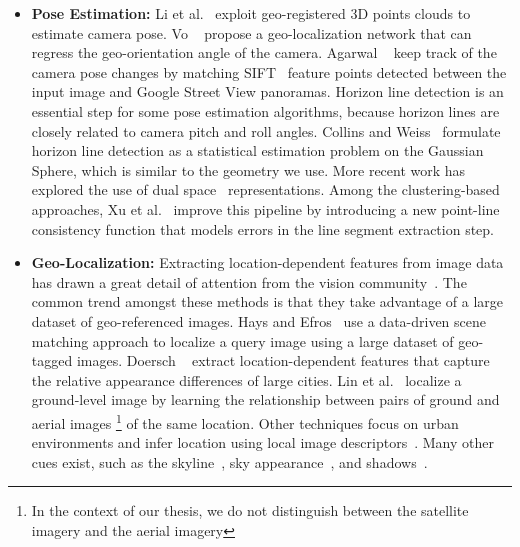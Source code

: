 \begin{itemize}[noitemsep]

\item \textbf{Pose Estimation:}
Li et al.~\cite{li2012worldwide} exploit geo-registered 3D points
clouds to estimate camera pose.
Vo \etal~\cite{vo2016localizing} propose a geo-localization network
that can regress the geo-orientation angle of the camera.
Agarwal \etal~\cite{agarwal2015metric} keep track of the camera pose
changes by matching SIFT~\cite{lowe1999object} feature points detected
between the input image and Google Street View panoramas.
%
Horizon line detection is an essential step for some pose
estimation algorithms, because horizon lines are closely related to
camera pitch and roll angles.
Collins and Weiss~\cite{unitsphere1990} formulate horizon line
detection as a statistical estimation problem on the Gaussian Sphere,
which is similar to the geometry we use.  More recent work has
explored the use of dual space~\cite{alignment2014,dualspace2013}
representations. Among the clustering-based approaches, Xu et
al.~\cite{kitware2013} improve this pipeline by introducing a new
point-line consistency function that models errors in the line segment
extraction step.
\newline

\item \textbf{Geo-Localization:}
Extracting location-dependent features from
image data has drawn a great detail of attention from the vision
community~\cite{jacobs07geolocate, jacobs11geolocate,
jacobs08geoorient}. The common trend amongst these methods is that
they take advantage of a large dataset of geo-referenced images. Hays
and Efros~\cite{hays2008im2gps} use a data-driven scene matching
approach to localize a query image using a large dataset of geo-tagged
images.  Doersch \etal~\cite{doersch2012what} extract
location-dependent features that capture the relative appearance
differences of large cities.  Lin et al.~\cite{lin2013cross} localize
a ground-level image by learning the relationship between pairs of
ground and aerial images \footnote{In the context of our thesis, we
do not distinguish between the satellite imagery and the aerial
imagery} of the same location. Other techniques focus
on urban environments and infer location using local image
descriptors~\cite{schindler2008detecting,snavely2006photo}.
Many other cues exist, such as the
skyline~\cite{baatz2012large,ramalingam2009geolocalization}, sky
appearance~\cite{lalonde2010sun,workman2014rainbow}, and
shadows~\cite{junejo2008estimating,wu2010geo}.
\newline


\end{itemize}
